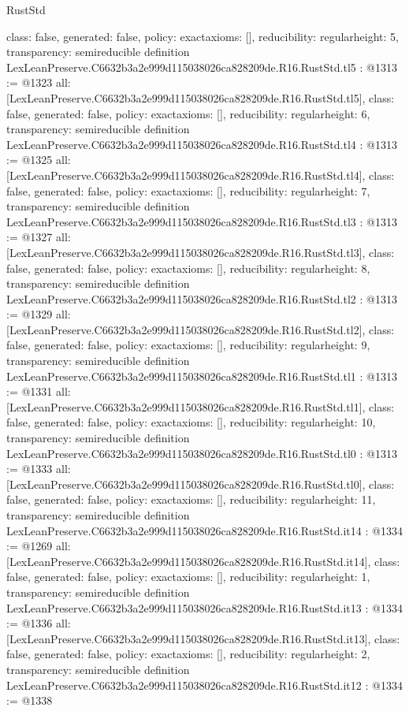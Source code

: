 \begin{lexlean}{RustStd}
\begin{coremodule}
{  class: false,
  generated: false,
  policy: exact{axioms: []},
  reducibility: regular{height: 5},
  transparency: semireducible
}
definition LexLeanPreserve.C6632b3a2e999d115038026ca828209de.R16.RustStd.tl5 : @1313 := @1323 {
  all: [LexLeanPreserve.C6632b3a2e999d115038026ca828209de.R16.RustStd.tl5],
  class: false,
  generated: false,
  policy: exact{axioms: []},
  reducibility: regular{height: 6},
  transparency: semireducible
}
definition LexLeanPreserve.C6632b3a2e999d115038026ca828209de.R16.RustStd.tl4 : @1313 := @1325 {
  all: [LexLeanPreserve.C6632b3a2e999d115038026ca828209de.R16.RustStd.tl4],
  class: false,
  generated: false,
  policy: exact{axioms: []},
  reducibility: regular{height: 7},
  transparency: semireducible
}
definition LexLeanPreserve.C6632b3a2e999d115038026ca828209de.R16.RustStd.tl3 : @1313 := @1327 {
  all: [LexLeanPreserve.C6632b3a2e999d115038026ca828209de.R16.RustStd.tl3],
  class: false,
  generated: false,
  policy: exact{axioms: []},
  reducibility: regular{height: 8},
  transparency: semireducible
}
definition LexLeanPreserve.C6632b3a2e999d115038026ca828209de.R16.RustStd.tl2 : @1313 := @1329 {
  all: [LexLeanPreserve.C6632b3a2e999d115038026ca828209de.R16.RustStd.tl2],
  class: false,
  generated: false,
  policy: exact{axioms: []},
  reducibility: regular{height: 9},
  transparency: semireducible
}
definition LexLeanPreserve.C6632b3a2e999d115038026ca828209de.R16.RustStd.tl1 : @1313 := @1331 {
  all: [LexLeanPreserve.C6632b3a2e999d115038026ca828209de.R16.RustStd.tl1],
  class: false,
  generated: false,
  policy: exact{axioms: []},
  reducibility: regular{height: 10},
  transparency: semireducible
}
definition LexLeanPreserve.C6632b3a2e999d115038026ca828209de.R16.RustStd.tl0 : @1313 := @1333 {
  all: [LexLeanPreserve.C6632b3a2e999d115038026ca828209de.R16.RustStd.tl0],
  class: false,
  generated: false,
  policy: exact{axioms: []},
  reducibility: regular{height: 11},
  transparency: semireducible
}
definition LexLeanPreserve.C6632b3a2e999d115038026ca828209de.R16.RustStd.it14 : @1334 := @1269 {
  all: [LexLeanPreserve.C6632b3a2e999d115038026ca828209de.R16.RustStd.it14],
  class: false,
  generated: false,
  policy: exact{axioms: []},
  reducibility: regular{height: 1},
  transparency: semireducible
}
definition LexLeanPreserve.C6632b3a2e999d115038026ca828209de.R16.RustStd.it13 : @1334 := @1336 {
  all: [LexLeanPreserve.C6632b3a2e999d115038026ca828209de.R16.RustStd.it13],
  class: false,
  generated: false,
  policy: exact{axioms: []},
  reducibility: regular{height: 2},
  transparency: semireducible
}
definition LexLeanPreserve.C6632b3a2e999d115038026ca828209de.R16.RustStd.it12 : @1334 := @1338 {
}
\end{coremodule}
\end{lexlean}
